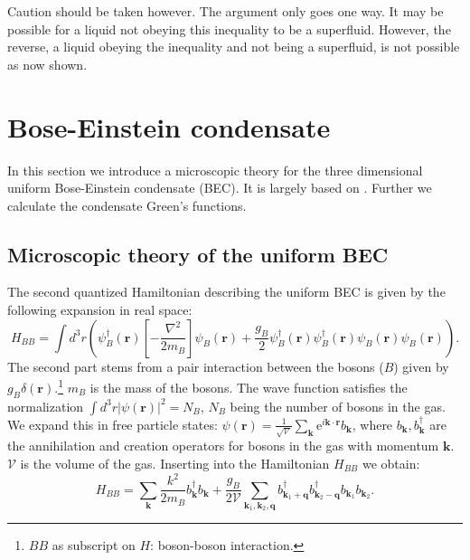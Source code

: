 Caution should be taken however. The argument only goes one way. It may be possible for a liquid not obeying this inequality to be a superfluid. However, the reverse, a liquid obeying the inequality and not being a superfluid, is not possible as now shown. 


\section{Bose-Einstein condensate}
In this section we introduce a microscopic theory for the three dimensional uniform Bose-Einstein condensate (BEC). It is largely based on \cite[chapter 8]{Pethick}. Further we calculate the condensate Green's functions. 

\subsection{Microscopic theory of the uniform BEC}
\label{sec.BEC}
The second quantized Hamiltonian describing the uniform BEC is given by the following expansion in real space: 
\begin{equation}
H_{BB} = \int d^3 r \left(\psi_B^\dagger(\mathbf{r})\left[-\frac{\nabla^2}{2m_B}\right]\psi_B(\mathbf{r}) + \frac{g_B}{2}\psi_B^\dagger(\mathbf{r})\psi_B^\dagger(\mathbf{r})\psi_B(\mathbf{r})\psi_B(\mathbf{r})  \right). 
\label{eq.BECHamiltonianrealspace}
\end{equation}
The second part stems from a pair interaction between the bosons ($B$) given by $g_B\delta(\mathbf{r})$.\footnote{$BB$ as subscript on $H$: boson-boson interaction.} $m_B$ is the mass of the bosons. The wave function satisfies the normalization $\int d^3 r |\psi(\mathbf{r})|^2 = N_B$, $N_B$ being the number of bosons in the gas. We expand this in free particle states: $\psi(\mathbf{r}) = \frac{1}{\sqrt{\mathcal{V}}}\sum_\mathbf{k} \text{e}^{i\mathbf{k}\cdot\mathbf{r}}b_\mathbf{k}$, where $b_\mathbf{k}, b^\dagger_\mathbf{k}$ are the annihilation and creation operators for bosons in the gas with momentum $\mathbf{k}$. $\mathcal{V}$ is the volume of the gas. Inserting into the Hamiltonian $H_{BB}$ we obtain: 
\begin{equation}
H_{BB} = \sum_\mathbf{k} \frac{k^2}{2m_B}b_\mathbf{k}^\dagger b_\mathbf{k} + \frac{g_B}{2\mathcal{V}}\sum_{\mathbf{k}_1,\mathbf{k}_2,\mathbf{q}} b^\dagger_{\mathbf{k}_1+\mathbf{q}}b^\dagger_{\mathbf{k}_2-\mathbf{q}}b_{\mathbf{k}_1}b_{\mathbf{k}_2}. 
\label{eq.BECHamiltonianmomentumspace} 
\end{equation}
